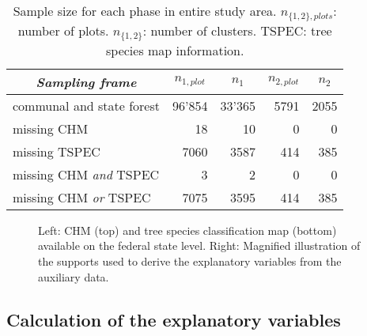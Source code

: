 \begin{table}[H]
	\begin{center}
		\caption{Sample size for each phase in entire study area. $n_{\{1,2\},plots}$: number of plots. $n_{\{1,2\}}$: number of clusters. TSPEC: tree species map information.}
		\vspace{0.2cm}
		\label{tab:ssize}
		{\small %
			\begin{tabular}{l|r|r|r|r}
				\hline
				\multicolumn{1}{c|}{\textit{Sampling frame}} & \multicolumn{1}{c|}{\textbf{$n_{1,plot}$}}  & \multicolumn{1}{c|}{\textbf{$n_1$}}  & \multicolumn{1}{c|}{\textbf{$n_{2,plot}$}}  & \multicolumn{1}{c}{\textbf{$n_2$}} \\ %
				\hline \hline
				communal and state forest & 96'854 & 33'365 & 5791 & 2055\\
				\hspace{5mm} \footnotesize missing CHM & \footnotesize 18 & \footnotesize 10 & \footnotesize 0 & \footnotesize 0\\ %
				\hspace{5mm} \footnotesize missing TSPEC & \footnotesize 7060  & \footnotesize 3587 & \footnotesize 414 & \footnotesize 385\\ %
				\hspace{5mm} \footnotesize missing CHM \textit{and} TSPEC & \footnotesize 3 & \footnotesize 2 & \footnotesize 0 & \footnotesize 0\\ %
				\hspace{5mm} \footnotesize missing CHM \textit{or} TSPEC & \footnotesize 7075 & \footnotesize 3595 & \footnotesize 414 & \footnotesize 385\\ %
				\hline \hline
			\end{tabular}
		} %
	\end{center}
\end{table}


\begin{figure}[H]
	\centering
	\caption{Left: CHM (top) and tree species classification map (bottom) available on the federal state level. Right: Magnified illustration of the supports used to derive the explanatory variables from the auxiliary data.}
	\label{fig:Auxvars}
\end{figure}




\subsection{Calculation of the explanatory variables}
\label{sec:expvarcalc}

